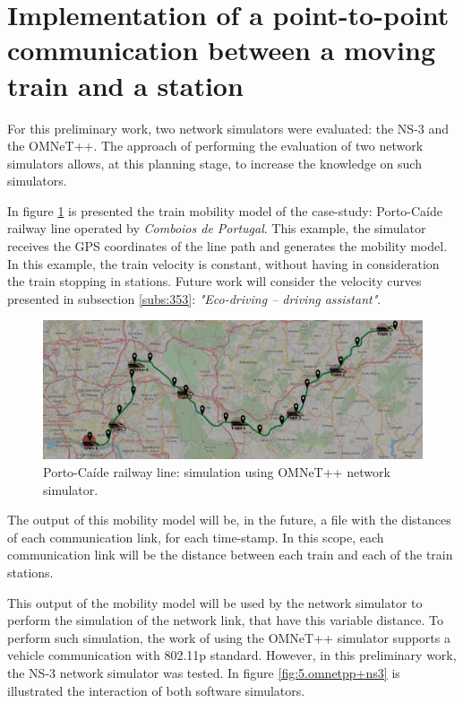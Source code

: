 	
\section{Implementation of a point-to-point communication between a moving train and a station}

For this preliminary work, two network simulators were evaluated: the NS-3 and the OMNeT++. The approach of performing the evaluation of two network simulators allows, at this planning stage, to increase the knowledge on such simulators.

In figure \ref{fig:5.porto-caide} is presented the train mobility model of the case-study: Porto-Caíde railway line operated by \textit{Comboios de Portugal}. This example, the simulator receives the GPS coordinates of the line path and generates the mobility model. In this example, the train velocity is constant, without having in consideration the train stopping in stations. Future work will consider the velocity curves presented in subsection \ref{subs:353}: \textit{"Eco-driving – driving assistant"}.


\begin{figure}[h!]
	\centering
	\includegraphics[width=\textwidth,keepaspectratio]{figures/5.PreliminaryW/porto-caide2}
	\caption{Porto-Caíde railway line: simulation using OMNeT++ network simulator.}
	\label{fig:5.porto-caide}
\end{figure}
	
	
The output of this mobility model will be, in the future, a file with the distances of each communication link, for each time-stamp. In this scope, each communication link will be the distance between each train and each of the train stations.

This output of the mobility model will be used by the network simulator to perform the simulation of the network link, that have this variable distance. To perform such simulation, the work of \cite{noori2013} using the OMNeT++ simulator supports a vehicle communication with 802.11p standard. However, in this preliminary work, the NS-3 network simulator was tested. In figure \ref{fig:5.omnetpp+ns3} is illustrated the interaction of both software simulators.

